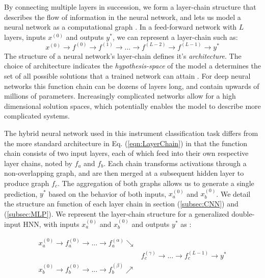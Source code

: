 \documentclass[conference,onecolumn,letterpaper]{IEEEtran}
\begin{document}
By connecting multiple layers in succession, we form a layer-chain structure that describes the flow of information in the neural network, and lets us model a neural network as a computational graph \cite{Geron,Goodfellow}. In a feed-forward network with $L$ layers, inputs $x^{(0)}$ and outputs $y^*$, we can represent a layer-chain such as:
\begin{equation}
    \label{eqn:LayerChain}
    x^{(0)} \rightarrow f^{(0)} \rightarrow f^{(1)} \rightarrow ... \rightarrow f^{(L-2)} \rightarrow f^{(L-1)} \rightarrow y^*
\end{equation}
The structure of a neural network's layer-chain defines it's \textit{architecture}. The choice of architecture indicates the \textit{hypothesis-space} of the model a determines the set of all possible solutions that a trained network can attain \cite{Goodfellow,James}. For deep neural networks this function chain can be dozens of layers long, and contain upwards of millions of parameters. Increasingly complicated networks allow for a high dimensional solution spaces, which potentially enables the model to describe more complicated systems.

The hybrid neural network used in this instrument classification task differs from the more standard architecture in Eq. (\ref{eqn:LayerChain}) in that the function chain consists of two input layers, each of which feed into their own respective layer chains, noted by $f_a$ and $f_b$. Each chain transforms activations through a non-overlapping graph, and are then merged at a subsequent hidden layer to produce graph $f_c$. The aggregation of both graphs allows us to generate a single prediction, $y^*$ based on the behavior of both inputs, $x^{(0)}_a$ and $x^{(0)}_b$. We detail the structure an function of each layer chain in section (\ref{subsec:CNN}) and (\ref{subsec:MLP}). We represent the layer-chain structure for a generalized double-input HNN, with inputs $x^{(0)}_a$ and $x^{(0)}_b$ and outputs $y^*$ as :

\begin{equation}
    \label{eqn:LayerGraph}
    \begin{split}
        x^{(0)}_a \rightarrow f^{(0)}_a \rightarrow  ... \rightarrow f^{(\alpha)}_a \searrow &\\
                & f^{(\gamma)}_c \rightarrow ... \rightarrow f^{(L-1)}_c \rightarrow y^* \\
        x^{(0)}_b \rightarrow f^{(0)}_b \rightarrow  ... \rightarrow f^{(\beta)}_b \nearrow &\\
    \end{split}
\end{equation}
\end{document}
